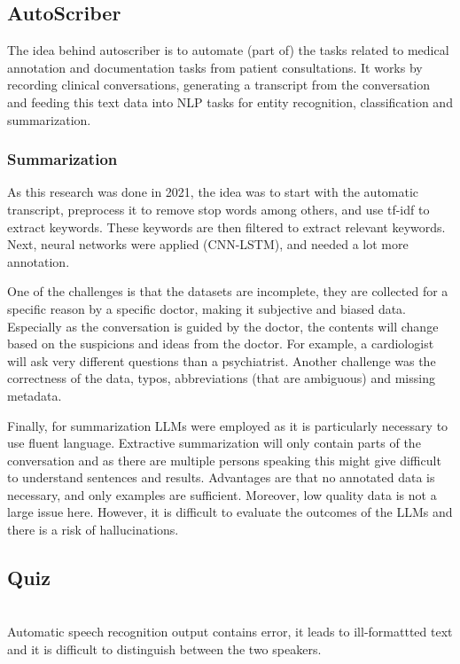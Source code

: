 \subsection{AutoScriber}

The idea behind autoscriber is to automate (part of) the tasks related
to medical annotation and documentation tasks from patient consultations.
It works by recording clinical conversations, generating a transcript from
the conversation and feeding this text data into NLP tasks for entity
recognition,
classification and summarization.

\subsubsection{Summarization}

As this research was done in 2021, the idea was to start with the automatic
transcript, preprocess it to remove stop words among others, and use tf-idf
to extract keywords. These keywords are then filtered to extract relevant
keywords. Next, neural networks were applied (CNN-LSTM), and needed a lot
more annotation.

One of the challenges is that the datasets are incomplete, they are collected
for a specific reason by a specific doctor, making it subjective and biased
data. Especially as the conversation is guided by the doctor, the contents will
change based on the suspicions and ideas from the doctor. For
example, a cardiologist
will ask very different questions than a psychiatrist.
Another challenge was the correctness of the data, typos,
abbreviations (that are ambiguous)
and missing metadata.

Finally, for summarization LLMs were employed as it is particularly necessary to
use fluent language. Extractive summarization will only contain parts
of the conversation
and as there are multiple persons speaking this might give difficult
to understand sentences
and results. Advantages are that no annotated data is necessary, and
only examples are sufficient.
Moreover, low quality data is not a large issue here. However, it is
difficult to evaluate the
outcomes of the LLMs and there is a risk of hallucinations.

\subsection{Quiz}

\begin{quiz}
  ~\\
  Automatic speech recognition output contains error, it leads to
  ill-formattted text and it is difficult to distinguish between the
  two speakers.
\end{quiz}

